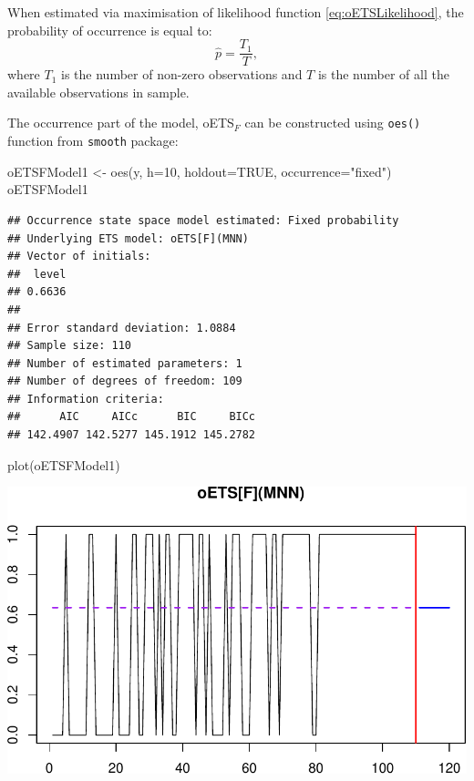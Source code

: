 \documentclass[
]{book}
\newenvironment{Shaded}{\begin{snugshade}}{\end{snugshade}}
\newcommand{\AttributeTok}[1]{\textcolor[rgb]{0.77,0.63,0.00}{#1}}
\newcommand{\ConstantTok}[1]{\textcolor[rgb]{0.00,0.00,0.00}{#1}}
\newcommand{\DecValTok}[1]{\textcolor[rgb]{0.00,0.00,0.81}{#1}}
\newcommand{\FunctionTok}[1]{\textcolor[rgb]{0.00,0.00,0.00}{#1}}
\newcommand{\NormalTok}[1]{#1}
\newcommand{\OtherTok}[1]{\textcolor[rgb]{0.56,0.35,0.01}{#1}}
\newcommand{\StringTok}[1]{\textcolor[rgb]{0.31,0.60,0.02}{#1}}
\theoremstyle{definition}
\theoremstyle{definition}
\theoremstyle{definition}
\theoremstyle{definition}
\theoremstyle{remark}
\begin{document}
When estimated via maximisation of likelihood function \eqref{eq:oETSLikelihood}, the probability of occurrence is equal to:
\begin{equation}
    \hat{p} = \frac{T_1}{T},
    \label{eq:oETSFixedProbabilityMLE}
\end{equation}
where \(T_1\) is the number of non-zero observations and \(T\) is the number of all the available observations in sample.

The occurrence part of the model, oETS\(_F\) can be constructed using \texttt{oes()} function from \texttt{smooth} package:

\begin{Shaded}
\begin{Highlighting}[]
\NormalTok{oETSFModel1 }\OtherTok{\textless{}{-}} \FunctionTok{oes}\NormalTok{(y, }\AttributeTok{h=}\DecValTok{10}\NormalTok{, }\AttributeTok{holdout=}\ConstantTok{TRUE}\NormalTok{,}
                   \AttributeTok{occurrence=}\StringTok{"fixed"}\NormalTok{)}
\NormalTok{oETSFModel1}
\end{Highlighting}
\end{Shaded}

\begin{verbatim}
## Occurrence state space model estimated: Fixed probability
## Underlying ETS model: oETS[F](MNN)
## Vector of initials:
##  level 
## 0.6636 
## 
## Error standard deviation: 1.0884
## Sample size: 110
## Number of estimated parameters: 1
## Number of degrees of freedom: 109
## Information criteria: 
##      AIC     AICc      BIC     BICc 
## 142.4907 142.5277 145.1912 145.2782
\end{verbatim}

\begin{Shaded}
\begin{Highlighting}[]
\FunctionTok{plot}\NormalTok{(oETSFModel1)}
\end{Highlighting}
\end{Shaded}

\includegraphics{adam_files/figure-latex/oETSFExample1-1.pdf}
\end{document}
